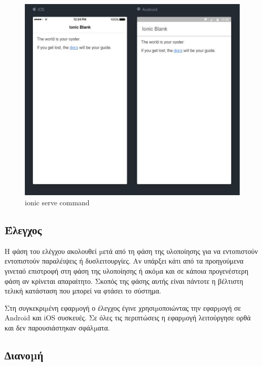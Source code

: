 \documentclass[a4paper,12pt]{article}
\begin{document}
				\begin{figure}[!htb]
					\begin{center}
						\caption{ionic serve command}
						\vspace*{0.5cm}
						\includegraphics[width=\linewidth]{ionicServe} 
					\end{center}
				\end{figure}

		\newpage
		\subsection{Έλεγχος}

		Η φάση του ελέγχου ακολουθεί µετά από τη φάση της υλοποίησης για να εντοπιστούν
		εντοπιστούν παραλέιψεις ή δυσλειτουργίες. Αν υπάρξει κάτι από τα προηγούμενα  γινεταό επιστροφή στη φάση της υλοποίησης
		ή ακόµα και σε κάποια προγενέστερη φάση αν κρίνεται απαραίτητο. Σκοπός της φάσης αυτής είναι
		πάντοτε η βέλτιστη τελική κατάσταση που μπορεί να φτάσει το σύστημα.

		Στη συγκεκριµένη εφαρµογή ο έλεγχος έγινε χρησιµοποιώντας την
		εφαρµογή σε Android και iOS συσκευές. Σε όλες τις
		περιπτώσεις η εφαρµογή λειτούργησε ορθά και δεν παρουσιάστηκαν σφάλµατα.
		
		\subsection{∆ιανοµή}
\end{document}
